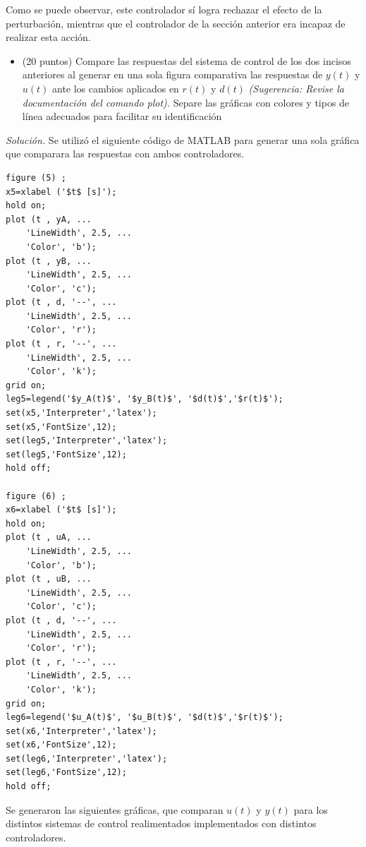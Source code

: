 Como se puede observar, este controlador sí logra rechazar el efecto de la perturbación, mientras que el controlador de la sección anterior era incapaz de realizar esta acción.

\begin{itemize}
    \item (20 puntos) Compare las respuestas del sistema de control de los dos incisos anteriores
al generar en una sola figura comparativa las respuestas de $y(t)$ y $u(t)$ ante los
cambios aplicados en $r(t)$ y $d(t)$ \textit{(Sugerencia: Revise la documentación del comando
plot).} Separe las gráficas con colores y tipos de línea adecuados para facilitar su
identificación
\end{itemize}

\textit{Solución.} Se utilizó el siguiente código de MATLAB para generar una sola gráfica que comparara las respuestas con ambos controladores.

\vspace{1em}
\begin{mdframed}
\begin{verbatim}
figure (5) ;
x5=xlabel ('$t$ [s]');
hold on;
plot (t , yA, ...
    'LineWidth', 2.5, ...
    'Color', 'b');
plot (t , yB, ...
    'LineWidth', 2.5, ...
    'Color', 'c');
plot (t , d, '--', ...
    'LineWidth', 2.5, ...
    'Color', 'r');
plot (t , r, '--', ...
    'LineWidth', 2.5, ...
    'Color', 'k');
grid on;
leg5=legend('$y_A(t)$', '$y_B(t)$', '$d(t)$','$r(t)$');
set(x5,'Interpreter','latex');
set(x5,'FontSize',12);
set(leg5,'Interpreter','latex');
set(leg5,'FontSize',12);
hold off;

figure (6) ;
x6=xlabel ('$t$ [s]');
hold on;
plot (t , uA, ...
    'LineWidth', 2.5, ...
    'Color', 'b');
plot (t , uB, ...
    'LineWidth', 2.5, ...
    'Color', 'c');
plot (t , d, '--', ...
    'LineWidth', 2.5, ...
    'Color', 'r');
plot (t , r, '--', ...
    'LineWidth', 2.5, ...
    'Color', 'k');
grid on;
leg6=legend('$u_A(t)$', '$u_B(t)$', '$d(t)$','$r(t)$');
set(x6,'Interpreter','latex');
set(x6,'FontSize',12);
set(leg6,'Interpreter','latex');
set(leg6,'FontSize',12);
hold off;
\end{verbatim}
\end{mdframed}

\newpage

Se generaron las siguientes gráficas, que comparan $u(t)$ y $y(t)$ para los distintos sistemas de control realimentados implementados con distintos controladores.

